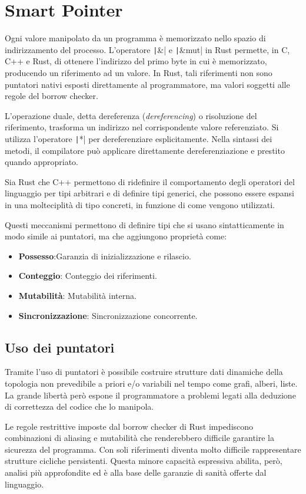 \section{Smart Pointer}
Ogni valore manipolato da un programma è memorizzato nello spazio di
indirizzamento del processo.
L'operatore \texttt|&| e \texttt|&mut| in Rust
permette, in C, C++ e Rust, di ottenere l'indirizzo del primo byte in
cui è memorizzato, producendo un riferimento ad un valore.
In Rust, tali riferimenti non sono puntatori nativi esposti direttamente al
programmatore, ma valori soggetti alle regole del borrow checker.

L'operazione duale, detta dereferenza (\textit{dereferencing}) o risoluzione del
riferimento, trasforma un indirizzo nel corrispondente valore referenziato. Si
utilizza l'operatore \texttt|*| per dereferenziare esplicitamente.
Nella sintassi dei metodi, il compilatore può applicare direttamente
dereferenziazione e prestito quando appropriato.

Sia Rust che C++ permettono di ridefinire il comportamento degli operatori del
linguaggio per tipi arbitrari e di definire tipi generici, che possono essere
espansi in una molteciplità di tipo concreti, in funzione di come vengono utilizzati.


Questi meccanismi permettono di definire tipi che si usano sintatticamente in
modo simile ai puntatori, ma che aggiungono proprietà come:

\begin{itemize}
  \item \textbf{Possesso}:Garanzia di inizializzazione e rilascio.
  \item \textbf{Conteggio}: Conteggio dei riferimenti.
  \item \textbf{Mutabilità}: Mutabilità interna.
  \item \textbf{Sincronizzazione}: Sincronizzazione concorrente.
\end{itemize}

\subsection{Uso dei puntatori}
Tramite l'uso di puntatori è possibile costruire strutture dati dinamiche della
topologia non prevedibile a priori e/o variabili nel tempo come grafi, alberi,
liste. La grande libertà però espone il programmatore a problemi legati alla deduzione di
correttezza del codice che lo manipola.

Le regole restrittive imposte dal borrow checker di Rust impediscono combinazioni
di aliasing e mutabilità che renderebbero difficile garantire la sicurezza del
programma. Con soli riferimenti diventa molto difficile rappresentare strutture
cicliche persistenti.
Questa minore capacità espressiva abilita, però, analisi più approfondite ed è
alla base delle garanzie di sanità offerte dal linguaggio.


